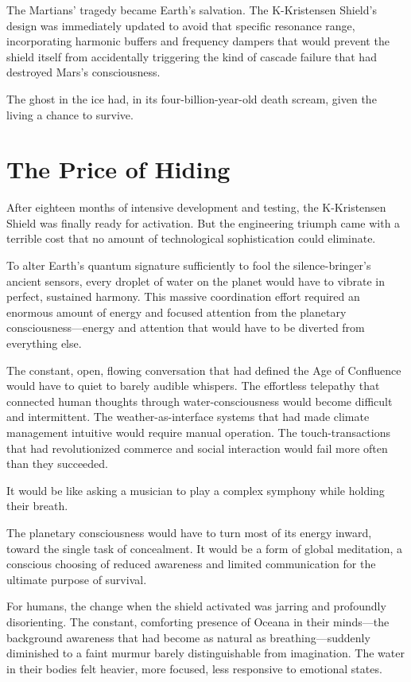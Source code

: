 The Martians' tragedy became Earth's salvation. The K-Kristensen Shield's design was immediately updated to avoid that specific resonance range, incorporating harmonic buffers and frequency dampers that would prevent the shield itself from accidentally triggering the kind of cascade failure that had destroyed Mars's consciousness.

The ghost in the ice had, in its four-billion-year-old death scream, given the living a chance to survive.

\section{The Price of Hiding}

After eighteen months of intensive development and testing, the K-Kristensen Shield was finally ready for activation. But the engineering triumph came with a terrible cost that no amount of technological sophistication could eliminate.

To alter Earth's quantum signature sufficiently to fool the silence-bringer's ancient sensors, every droplet of water on the planet would have to vibrate in perfect, sustained harmony. This massive coordination effort required an enormous amount of energy and focused attention from the planetary consciousness—energy and attention that would have to be diverted from everything else.

The constant, open, flowing conversation that had defined the Age of Confluence would have to quiet to barely audible whispers. The effortless telepathy that connected human thoughts through water-consciousness would become difficult and intermittent. The weather-as-interface systems that had made climate management intuitive would require manual operation. The touch-transactions that had revolutionized commerce and social interaction would fail more often than they succeeded.

It would be like asking a musician to play a complex symphony while holding their breath.

The planetary consciousness would have to turn most of its energy inward, toward the single task of concealment. It would be a form of global meditation, a conscious choosing of reduced awareness and limited communication for the ultimate purpose of survival.

For humans, the change when the shield activated was jarring and profoundly disorienting. The constant, comforting presence of Oceana in their minds—the background awareness that had become as natural as breathing—suddenly diminished to a faint murmur barely distinguishable from imagination. The water in their bodies felt heavier, more focused, less responsive to emotional states.

